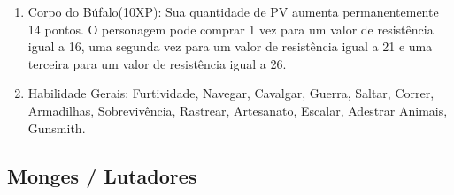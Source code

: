 \begin{enumerate}
    \item Corpo do Búfalo(10XP): Sua quantidade de PV aumenta permanentemente 14 pontos. O personagem pode comprar 1 vez para um valor de resistência igual a 16, uma segunda vez para um valor de resistência igual a 21 e uma terceira para um valor de resistência igual a 26.

		
\item Habilidade Gerais: Furtividade, Navegar, Cavalgar, Guerra, Saltar, Correr, Armadilhas, Sobrevivência, Rastrear, Artesanato, Escalar, Adestrar Animais, Gunsmith.
\end{enumerate}
 

\subsection{Monges / Lutadores} 
    
